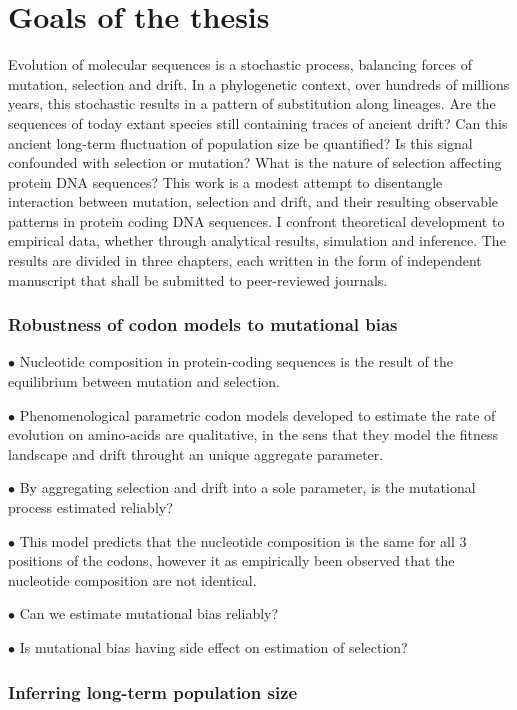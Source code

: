 \chapter{Goals of the thesis}
{
	\hypersetup{linkcolor=GREYDARK}
	\minitoc
}
\label{chap:goals}

Evolution of molecular sequences is a stochastic process, balancing forces of mutation, selection and drift.
In a phylogenetic context, over hundreds of millions years, this stochastic results in a pattern of substitution along lineages.
Are the sequences of today extant species still containing traces of ancient drift?
Can this ancient long-term fluctuation of population size be quantified?
Is this signal confounded with selection or mutation?
What is the nature of selection affecting protein DNA sequences?
This work is a modest attempt to disentangle interaction between mutation, selection and drift, and their resulting observable patterns in protein coding DNA sequences.
I confront theoretical development to empirical data, whether through analytical results, simulation and inference.
The results are divided in three chapters, each written in the form of independent manuscript that shall be submitted to peer-reviewed journals.

\subsection{Robustness of codon models to mutational bias}

$\bullet$ Nucleotide composition in protein-coding sequences is the result of the equilibrium between mutation and selection.

$\bullet$ Phenomenological parametric \gls{codon} models developed to estimate the rate of evolution on amino-acids are qualitative, in the sens that they model the fitness landscape and drift throught an unique aggregate parameter.

$\bullet$ By aggregating selection and drift into a sole parameter, is the mutational process estimated reliably?

$\bullet$ This model predicts that the nucleotide composition is the same for all $3$ positions of the codons, however it as empirically been observed that the nucleotide composition are not identical.

$\bullet$ Can we estimate mutational bias reliably?

$\bullet$ Is mutational bias having side effect on estimation of selection?

\subsection{Inferring long-term population size}

